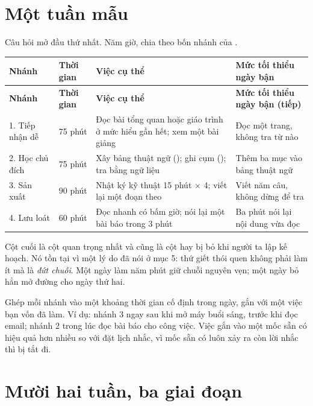 \documentclass[../../english.tex]{subfiles}
\begin{document}
\section{Một tuần mẫu}

Câu hỏi mở đầu thứ nhất. Năm giờ, chia theo bốn nhánh của .

\begin{center}\footnotesize
{}
\begin{longtable}{@{}L{2.2cm}L{1.6cm}L{5.0cm}L{5.4cm}@{}}
\toprule
\textbf{Nhánh} & \textbf{Thời gian} & \textbf{Việc cụ thể} & \textbf{Mức tối thiểu ngày bận}\\
\midrule
\endfirsthead
\toprule
\textbf{Nhánh} & \textbf{Thời gian} & \textbf{Việc cụ thể} & \textbf{Mức tối thiểu ngày bận (tiếp)}\\
\midrule
{}. Tiếp nhận dễ & 75 phút & Đọc bài tổng quan hoặc giáo trình ở mức hiểu gần hết; xem một bài giảng & Đọc một trang, không tra từ nào\\
2. Học chủ đích & 75 phút & Xây bảng thuật ngữ (); ghi cụm (); tra bằng ngữ liệu & Thêm ba mục vào bảng thuật ngữ\\
3. Sản xuất & 90 phút & Nhật ký kỹ thuật 15 phút \(\times\) 4; viết lại một đoạn theo  & Viết năm câu, không dừng để tra\\
4. Lưu loát & 60 phút & Đọc nhanh có bấm giờ; nói lại một bài báo trong 3 phút & Ba phút nói lại nội dung vừa đọc\\
\bottomrule
\end{longtable}
\end{center}

Cột cuối là cột quan trọng nhất và cũng là cột hay bị bỏ khi người ta lập kế hoạch. Nó tồn tại vì một lý do đã nói ở  mục 5: thứ giết thói quen không phải làm ít mà là \emph{đứt chuỗi}. Một ngày làm năm phút giữ chuỗi nguyên vẹn; một ngày bỏ hẳn mở đường cho ngày thứ hai.

\begin{cannho}
Ghép mỗi nhánh vào một khoảng thời gian cố định trong ngày, gắn với một việc bạn vốn đã làm. Ví dụ: nhánh 3 ngay sau khi mở máy buổi sáng, trước khi đọc email; nhánh 2 trong lúc đọc bài báo cho công việc. Việc gắn vào một mốc sẵn có hiệu quả hơn nhiều so với đặt lịch nhắc, vì mốc sẵn có luôn xảy ra còn lời nhắc thì bị tắt đi.
\end{cannho}

\section{Mười hai tuần, ba giai đoạn}
\end{document}
